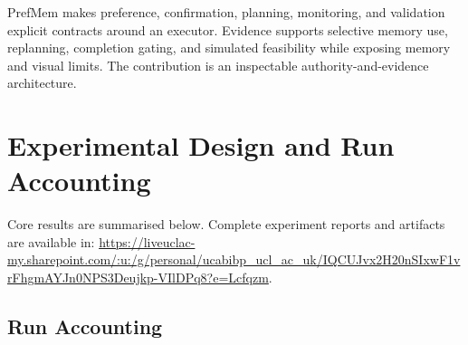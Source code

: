 \documentclass{article}
\begin{document}
PrefMem makes preference, confirmation, planning, monitoring, and validation
explicit contracts around an executor. Evidence supports selective memory use,
replanning, completion gating, and simulated feasibility while exposing memory
and visual limits. The contribution is an inspectable authority-and-evidence
architecture.


\clearpage
\appendix
{}

\section{Experimental Design and Run Accounting}
Core results are summarised below. Complete experiment reports and artifacts
are available in:
\url{https://liveuclac-my.sharepoint.com/:u:/g/personal/ucabibp_ucl_ac_uk/IQCUJvx2H20nSIxwF1vrFhgmAYJn0NPS3Deujkp-VIlDPq8?e=Lcfqzm}.
\label{app:experiment-design}

\subsection{Run Accounting}
\end{document}
